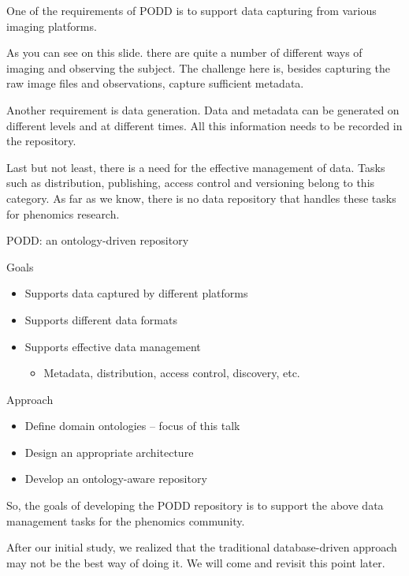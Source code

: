 \documentclass[ignorenonframetext,compress]{beamer}
\begin{document}
One of the requirements of PODD is to support data capturing from
various imaging platforms.

As you can see on this slide. there are quite a number of different
ways of imaging and observing the subject. The challenge here is,
besides capturing the raw image files and observations, capture
sufficient metadata.

Another requirement is data generation. Data and metadata can be
generated on different levels and at different times. All this
information needs to be recorded in the repository.

Last but not least, there is a need for the effective management of
data. Tasks such as distribution, publishing, access control and
versioning belong to this category. As far as we know, there is no
data repository that handles these tasks for phenomics research.

\begin{frame}{PODD: an ontology-driven repository}
\begin{block}{Goals}
    \begin{itemize}
        \item Supports data captured by different platforms
        \item Supports different data formats
        \item Supports effective data management
        \begin{itemize}
            \item Metadata, distribution, access control, discovery, etc.
        \end{itemize}
    \end{itemize}
\end{block}
\pause
\begin{block}{Approach}
    \begin{itemize}
        \item Define domain ontologies -- focus of this talk
        \item Design an appropriate architecture
        \item Develop an ontology-aware repository
    \end{itemize}
\end{block}
\end{frame}

So, the goals of developing the PODD repository is to support the
above data management tasks for the phenomics community.

After our initial study, we realized that the traditional
database-driven approach may not be the best way of doing it. We
will come and revisit this point later.
\end{document}
